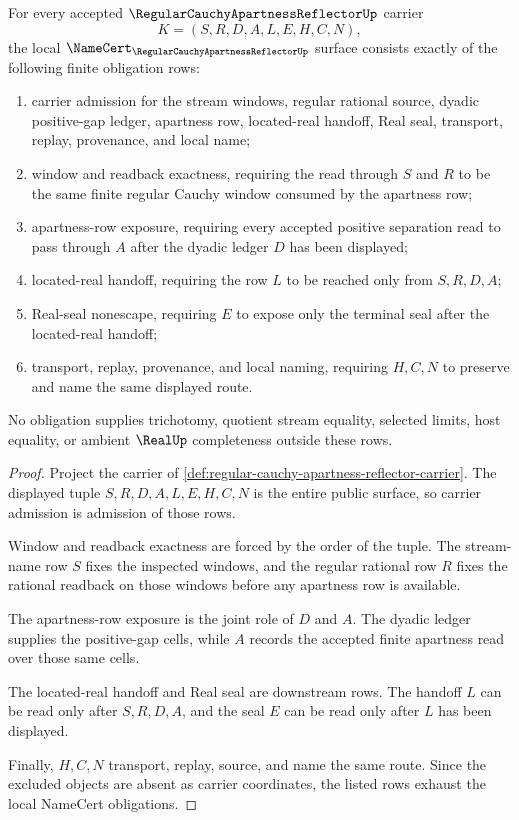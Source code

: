 \begin{theorem}
\label{thm:regular-cauchy-apartness-reflector-namecert-obligations}
For every accepted $\RegularCauchyApartnessReflectorUp$ carrier
$$
K=(S,R,D,A,L,E,H,C,N),
$$
the local $\NameCert_{\RegularCauchyApartnessReflectorUp}$ surface consists exactly of the following finite obligation rows:
\begin{enumerate}
\item carrier admission for the stream windows, regular rational source, dyadic positive-gap ledger, apartness row, located-real handoff, Real seal, transport, replay, provenance, and local name;
\item window and readback exactness, requiring the read through $S$ and $R$ to be the same finite regular Cauchy window consumed by the apartness row;
\item apartness-row exposure, requiring every accepted positive separation read to pass through $A$ after the dyadic ledger $D$ has been displayed;
\item located-real handoff, requiring the row $L$ to be reached only from $S,R,D,A$;
\item Real-seal nonescape, requiring $E$ to expose only the terminal seal after the located-real handoff;
\item transport, replay, provenance, and local naming, requiring $H,C,N$ to preserve and name the same displayed route.
\end{enumerate}
No obligation supplies trichotomy, quotient stream equality, selected limits, host equality, or ambient $\RealUp$ completeness outside these rows.
\end{theorem}
\begin{proof}
Project the carrier of \autoref{def:regular-cauchy-apartness-reflector-carrier}. The displayed tuple $S,R,D,A,L,E,H,C,N$ is the entire public surface, so carrier admission is admission of those rows.

Window and readback exactness are forced by the order of the tuple. The stream-name row $S$ fixes the inspected windows, and the regular rational row $R$ fixes the rational readback on those windows before any apartness row is available.

The apartness-row exposure is the joint role of $D$ and $A$. The dyadic ledger supplies the positive-gap cells, while $A$ records the accepted finite apartness read over those same cells.

The located-real handoff and Real seal are downstream rows. The handoff $L$ can be read only after $S,R,D,A$, and the seal $E$ can be read only after $L$ has been displayed.

Finally, $H,C,N$ transport, replay, source, and name the same route. Since the excluded objects are absent as carrier coordinates, the listed rows exhaust the local NameCert obligations.
\end{proof}

